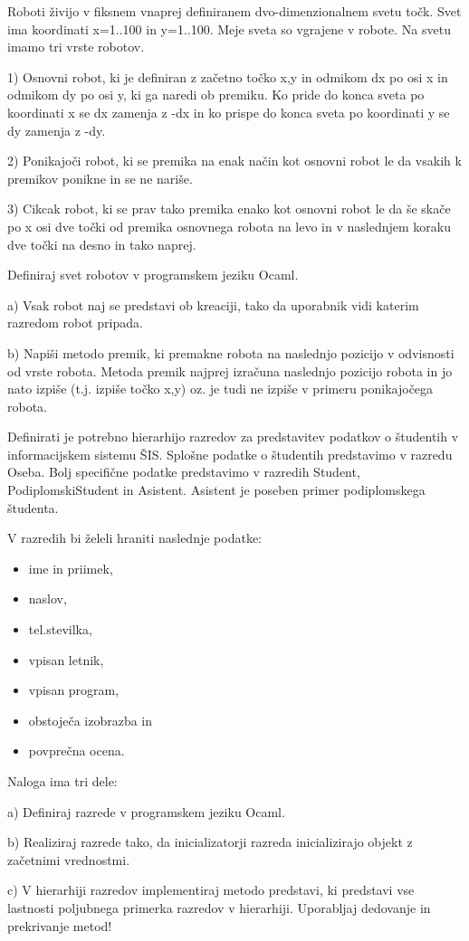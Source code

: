 \begin{ex}
Roboti \v zivijo v fiksnem vnaprej definiranem dvo-dimenzionalnem svetu to\v ck. Svet ima koordinati x=1..100 in y=1..100. Meje sveta so vgrajene v robote. Na svetu imamo tri vrste robotov.

1) Osnovni robot, ki je definiran z za\v cetno to\v cko x,y in odmikom dx po osi x in odmikom dy po osi y, ki ga naredi ob premiku. Ko pride do konca sveta po koordinati x se dx zamenja z -dx in ko prispe do konca sveta po koordinati y se dy zamenja z -dy.

2) Ponikajo\v ci robot, ki se premika na enak na\v cin kot osnovni robot le da vsakih k premikov ponikne in se ne nari\v se.

3) Cikcak robot, ki se prav tako premika enako kot osnovni robot le da \v se ska\v ce po x osi dve to\v cki od premika osnovnega robota na levo in v naslednjem koraku dve to\v cki na desno in tako naprej.

Definiraj svet robotov v programskem jeziku Ocaml. 

a) Vsak robot naj se predstavi ob kreaciji, tako da uporabnik vidi katerim razredom robot pripada.

b) Napi\v si metodo premik, ki premakne robota na naslednjo pozicijo v odvisnosti od vrste robota. Metoda premik najprej izra\v cuna naslednjo pozicijo robota in jo nato izpi\v se (t.j. izpi\v se to\v cko x,y) oz. je tudi ne izpi\v se v primeru ponikajo\v cega robota.



\end{ex}
\begin{ex}
Definirati je potrebno hierarhijo razredov za predstavitev podatkov o \v studentih v informacijskem sistemu \v SIS. Splo\v sne podatke o \v studentih predstavimo v razredu Oseba. Bolj specifi\v cne podatke predstavimo v razredih Student, PodiplomskiStudent in Asistent.
Asistent je poseben primer podiplomskega \v studenta. 

V razredih bi \v zeleli hraniti naslednje podatke: 
\begin{itemize}
    \item  ime in priimek, 
    \item  naslov, 
    \item  tel.stevilka, 
    \item  vpisan letnik, 
    \item  vpisan program, 
    \item  obstoje\v ca izobrazba in 
    \item  povpre\v cna ocena. 
\end{itemize}
Naloga ima tri dele:

a) Definiraj razrede v programskem jeziku Ocaml.

b) Realiziraj razrede tako, da inicializatorji razreda inicializirajo objekt z za\v cetnimi vrednostmi.

c) V hierarhiji razredov implementiraj metodo predstavi, ki predstavi vse lastnosti poljubnega primerka razredov v hierarhiji. Uporabljaj dedovanje in prekrivanje metod!



\end{ex}
